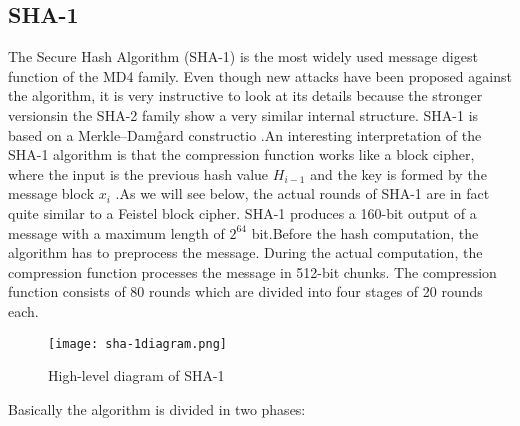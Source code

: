 \documentclass{article}
\begin{document}
\subsection{SHA-1}
The Secure Hash Algorithm (SHA-1) is the most widely used message digest function of the MD4 family. Even though new attacks have been proposed against the algorithm, it is very instructive to look at its details because the stronger versionsin the SHA-2 family show a very similar internal structure. SHA-1 is based on a Merkle–Damg̊ard constructio .An  interesting  interpretation  of  the  SHA-1  algorithm  is  that  the  compression function works like a block cipher, where the input is the previous hash value $H_{i−1}$ and the key is formed by the message block $x_i$ .As we will see below, the actual rounds of SHA-1 are in fact quite similar to a Feistel block cipher. SHA-1 produces a 160-bit output of a message with a maximum length of $2^64$ bit.Before the hash computation, the algorithm has to preprocess the message. During the actual computation, the compression function processes the message in 512-bit chunks. The compression function consists of 80 rounds which are divided into four stages of 20 rounds each.
\begin{figure} [H]
    \centering
    \texttt{[image: sha-1diagram.png]}
    \caption{High-level diagram of SHA-1}
\end{figure}
Basically the algorithm is divided in two phases:
\end{document}
